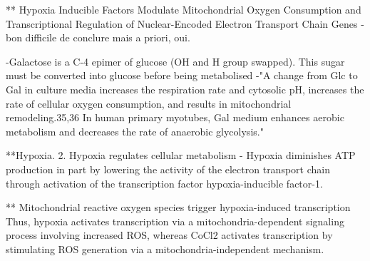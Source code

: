 \documentclass[11pt,a4paper]{article}
\begin{document}
** Hypoxia Inducible Factors Modulate Mitochondrial Oxygen Consumption and Transcriptional Regulation of Nuclear-Encoded Electron Transport Chain Genes
-bon difficile de conclure mais a priori, oui.

-Galactose is a C-4 epimer of glucose (OH and H group swapped). This sugar must be converted into glucose before being metabolised
-"A change from Glc to Gal in culture media increases the respiration rate and cytosolic pH, increases the rate of cellular oxygen consumption, and results in mitochondrial remodeling.35,36 In human primary myotubes, Gal medium enhances aerobic metabolism and decreases the rate of anaerobic glycolysis."


**Hypoxia. 2. Hypoxia regulates cellular metabolism
-  Hypoxia diminishes ATP production in part by lowering the activity of the electron transport chain through activation of the transcription factor hypoxia-inducible factor-1.


** Mitochondrial reactive oxygen species trigger hypoxia-induced transcription
Thus, hypoxia activates transcription via a mitochondria-dependent signaling process involving increased ROS, whereas CoCl2 activates transcription by stimulating ROS generation via a mitochondria-independent mechanism.
\end{document}

